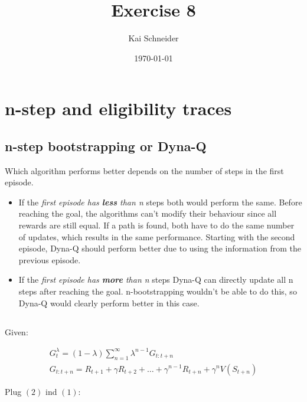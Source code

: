 \documentclass[11pt,a4paper]{article}
\title{Exercise 8}
\author{Kai Schneider}
\date{\today}
\begin{document}
 

\maketitle

\section{n-step and eligibility traces}

\subsection{ n-step bootstrapping or Dyna-Q}

Which algorithm performs better depends on the number of steps in the first episode.

\begin{itemize}
  \item If the \textit{first episode has \textbf{less} than n} steps both would perform the same. 
        Before reaching the goal, the algorithms can't modify their behaviour since all rewards are still equal.
        If a path is found, both have to do the same number of updates, which results in the same performance.
        Starting with the second episode, Dyna-Q should perform better due to using the information from the previous episode.

  \item If the \textit{first episode has \textbf{more} than n} steps Dyna-Q can directly update all n steps after reaching the
        goal. n-bootstrapping wouldn't be able to do this, so Dyna-Q would clearly perform better in this case. 
\end{itemize}

\newpage

\subsection{}

Given:

\begin{align}
    G_{t}^{\lambda} = (1-\lambda) \sum_{n=1}^{\infty} \lambda^{n-1} G_{t:t+n} \\
    G_{t:t+n} = R_{t+1} + \gamma R_{t+2} + \dots + \gamma^{n-1} R_{t+n} + \gamma^{n} V(S_{t+n})
\end{align}

Plug $(2)$ ind $(1)$:
\end{document}
